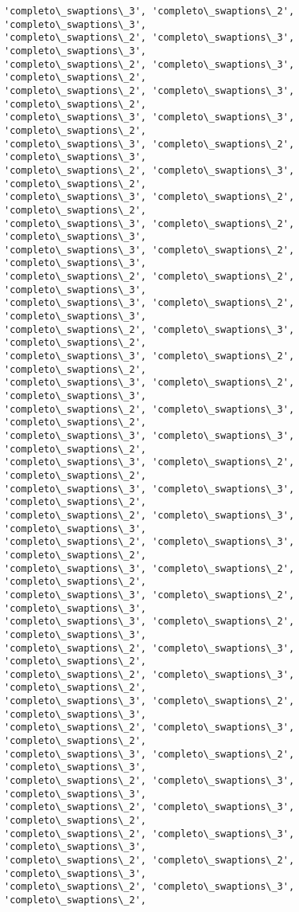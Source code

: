 \documentclass[11pt]{article}
\begin{document}
\begin{Verbatim}[commandchars=\\\{\}]
'completo\_swaptions\_3', 'completo\_swaptions\_2', 'completo\_swaptions\_3',
'completo\_swaptions\_2', 'completo\_swaptions\_3', 'completo\_swaptions\_3',
'completo\_swaptions\_2', 'completo\_swaptions\_3', 'completo\_swaptions\_2',
'completo\_swaptions\_2', 'completo\_swaptions\_3', 'completo\_swaptions\_2',
'completo\_swaptions\_3', 'completo\_swaptions\_3', 'completo\_swaptions\_2',
'completo\_swaptions\_3', 'completo\_swaptions\_2', 'completo\_swaptions\_3',
'completo\_swaptions\_2', 'completo\_swaptions\_3', 'completo\_swaptions\_2',
'completo\_swaptions\_3', 'completo\_swaptions\_2', 'completo\_swaptions\_2',
'completo\_swaptions\_3', 'completo\_swaptions\_2', 'completo\_swaptions\_3',
'completo\_swaptions\_3', 'completo\_swaptions\_2', 'completo\_swaptions\_3',
'completo\_swaptions\_2', 'completo\_swaptions\_2', 'completo\_swaptions\_3',
'completo\_swaptions\_3', 'completo\_swaptions\_2', 'completo\_swaptions\_3',
'completo\_swaptions\_2', 'completo\_swaptions\_3', 'completo\_swaptions\_2',
'completo\_swaptions\_3', 'completo\_swaptions\_2', 'completo\_swaptions\_2',
'completo\_swaptions\_3', 'completo\_swaptions\_2', 'completo\_swaptions\_3',
'completo\_swaptions\_2', 'completo\_swaptions\_3', 'completo\_swaptions\_2',
'completo\_swaptions\_3', 'completo\_swaptions\_3', 'completo\_swaptions\_2',
'completo\_swaptions\_3', 'completo\_swaptions\_2', 'completo\_swaptions\_2',
'completo\_swaptions\_3', 'completo\_swaptions\_3', 'completo\_swaptions\_2',
'completo\_swaptions\_2', 'completo\_swaptions\_3', 'completo\_swaptions\_3',
'completo\_swaptions\_2', 'completo\_swaptions\_3', 'completo\_swaptions\_2',
'completo\_swaptions\_3', 'completo\_swaptions\_2', 'completo\_swaptions\_2',
'completo\_swaptions\_3', 'completo\_swaptions\_2', 'completo\_swaptions\_3',
'completo\_swaptions\_3', 'completo\_swaptions\_2', 'completo\_swaptions\_3',
'completo\_swaptions\_2', 'completo\_swaptions\_3', 'completo\_swaptions\_2',
'completo\_swaptions\_2', 'completo\_swaptions\_3', 'completo\_swaptions\_2',
'completo\_swaptions\_3', 'completo\_swaptions\_2', 'completo\_swaptions\_3',
'completo\_swaptions\_2', 'completo\_swaptions\_3', 'completo\_swaptions\_2',
'completo\_swaptions\_3', 'completo\_swaptions\_2', 'completo\_swaptions\_3',
'completo\_swaptions\_2', 'completo\_swaptions\_3', 'completo\_swaptions\_3',
'completo\_swaptions\_2', 'completo\_swaptions\_3', 'completo\_swaptions\_2',
'completo\_swaptions\_2', 'completo\_swaptions\_3', 'completo\_swaptions\_3',
'completo\_swaptions\_2', 'completo\_swaptions\_2', 'completo\_swaptions\_3',
'completo\_swaptions\_2', 'completo\_swaptions\_3', 'completo\_swaptions\_2',

\end{Verbatim}
\end{document}
